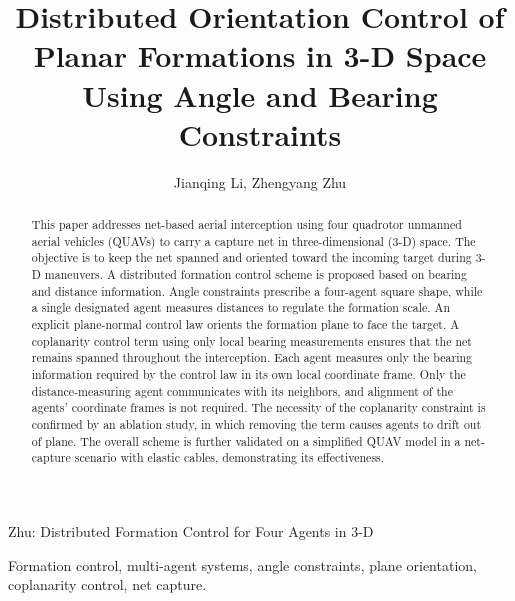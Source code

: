 \documentclass[letterpaper,journal]{IEEEtran}
\theoremstyle{plain}
\theoremstyle{definition}
\theoremstyle{remark}
\begin{document}
\title{Distributed Orientation Control of Planar Formations in 3-D Space Using Angle and Bearing Constraints}


\author{Jianqing Li, Zhengyang Zhu}

%
{Zhu: Distributed Formation Control for Four Agents in 3-D}


\maketitle

\begin{abstract}
This paper addresses net-based aerial interception using four quadrotor unmanned aerial vehicles (QUAVs) to carry a capture net in three-dimensional (3-D) space. The objective is to keep the net spanned and oriented toward the incoming target during 3-D maneuvers. A distributed formation control scheme is proposed based on bearing and distance information. Angle constraints prescribe a four-agent square shape, while a single designated agent measures distances to regulate the formation scale. An explicit plane-normal control law orients the formation plane to face the target. A coplanarity control term using only local bearing measurements ensures that the net remains spanned throughout the interception. Each agent measures only the bearing information required by the control law in its own local coordinate frame. Only the distance-measuring agent communicates with its neighbors, and alignment of the agents' coordinate frames is not required. The necessity of the coplanarity constraint is confirmed by an ablation study, in which removing the term causes agents to drift out of plane. The overall scheme is further validated on a simplified QUAV model in a net-capture scenario with elastic cables, demonstrating its effectiveness.
\end{abstract}

\begin{IEEEkeywords}
Formation control, multi-agent systems, angle constraints, plane orientation, coplanarity control, net capture.
\end{IEEEkeywords}
\end{document}
